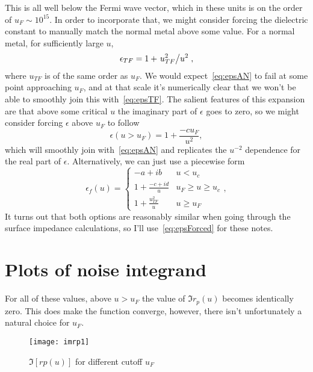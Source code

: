 \documentclass[11pt]{article}
\begin{document}
	This is all well below the Fermi wave vector, which in these units is on the order of $u_F \sim 10^{15}$.
	In order to incorporate that, we might consider forcing the dielectric constant to manually match the normal metal above some value.
	For a normal metal, for sufficiently large $u$,
	\begin{equation}
		\epsilon_{TF} = 1 + \flatfrac{u_{TF}^2}{u^2} \label{eq:epsTF},
	\end{equation}
	where $u_{TF}$ is of the same order as $u_F$.
	We would expect~\eqref{eq:epsAN} to fail at some point approaching $u_F$, and at that scale it's numerically clear that we won't be able to smoothly join this with~\eqref{eq:epsTF}.
	The salient features of this expansion are that above some critical $u$ the imaginary part of $\epsilon$ goes to zero, so we might consider forcing $\epsilon$ above $u_F$ to follow
	\begin{equation}
		\epsilon(u > u_F) = 1 + \frac{-c u_F}{u^2},
	\end{equation}
	which will smoothly join with~\eqref{eq:epsAN} and replicates the $u^{-2}$ dependence for the real part of $\epsilon$.
	Alternatively, we can just use a piecewise form
	\begin{equation}
		\epsilon_f(u) =
		\begin{cases}
			-a + i b & u < u_c \\
			1 + \frac{-c + i d}{u} &  u_F \geq u \geq u_c \\
			1 + \frac{u_{TF}^2}{u} &  u \geq u_F
		\end{cases},
	\end{equation} \label{eq:epsForced}
	It turns out that both options are reasonably similar when going through the surface impedance calculations, so I'll use~\eqref{eq:epsForced} for these notes.

	\section{Plots of noise integrand} \label{sec:plotsdiscussion}

	For all of these values, above $u > u_F$ the value of $\Im r_p(u)$ becomes identically zero.
	This does make the function converge, however, there isn't unfortunately a natural choice for $u_F$.
	\begin{figure}[htp]
		\centering
		\texttt{[image: imrp1]}
		\caption{$\Im[rp(u)]$ for different cutoff $u_F$} \label{fig:imrpVsCutoff}
	\end{figure}
\end{document}

